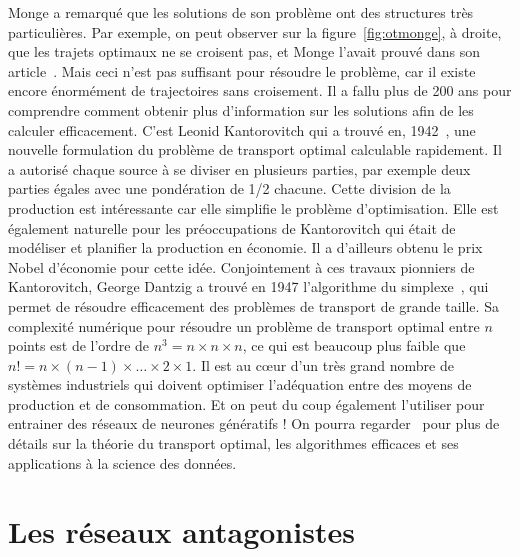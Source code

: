 Monge a remarqué que les solutions de son problème ont des structures très particulières. Par exemple, on peut observer sur la figure~\ref{fig:otmonge}, à droite, que les trajets optimaux ne se croisent pas, et Monge l'avait prouvé dans son article~\cite{Monge1781}. Mais ceci n'est pas suffisant pour résoudre le problème, car il existe encore énormément de trajectoires sans croisement. Il a fallu plus de 200 ans pour comprendre comment obtenir plus d'information sur les solutions afin de les calculer efficacement. 
%
C'est Leonid Kantorovitch qui a trouvé en, 1942~\cite{Kantorovich42}, une nouvelle formulation du problème de transport optimal calculable rapidement. Il a autorisé chaque source à se diviser en plusieurs parties, par exemple deux parties égales avec une pondération de 1/2 chacune. Cette division de la production est intéressante car elle simplifie le problème d'optimisation. Elle est également naturelle pour les préoccupations de Kantorovitch qui était de modéliser et planifier la production en économie. Il a d'ailleurs obtenu le prix Nobel d'économie pour cette idée. 
%
Conjointement à ces travaux pionniers de Kantorovitch, George Dantzig a trouvé en 1947 l'algorithme du simplexe~\cite{dantzig1990origins}, qui permet de résoudre efficacement des problèmes de transport de grande taille. Sa complexité numérique pour résoudre un problème de transport optimal entre $n$ points est de l'ordre de $n^3 = n \times n \times n$, ce qui est beaucoup plus faible que $n!=n \times (n-1) \times \ldots \times 2 \times 1$. Il est au c\oe{}ur d'un très grand nombre de systèmes industriels qui doivent optimiser l'adéquation entre des moyens de production et de consommation. Et on peut du coup également l'utiliser pour entrainer des réseaux de neurones génératifs ! On pourra regarder~\cite{PeyreCuturi} pour plus de détails sur la théorie du transport optimal, les algorithmes efficaces et ses applications à la science des données. 


\section{Les réseaux antagonistes}


